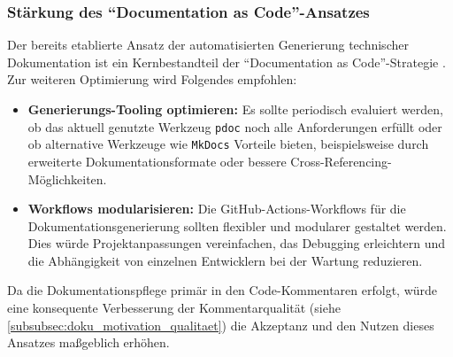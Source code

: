 \documentclass[12pt,oneside]{article}
\begin{document}
    \subsubsection{Stärkung des ``Documentation as Code''-Ansatzes}
    \label{subsubsec:doku_docs_as_code}
    Der bereits etablierte Ansatz der automatisierten Generierung technischer Dokumentation ist ein Kernbestandteil der ``Documentation as Code''-Strategie \cite{WriteTheDocsWhatIsDocsAsCode}. Zur weiteren Optimierung wird Folgendes empfohlen:
    \begin{itemize}
        \item \textbf{Generierungs-Tooling optimieren:} Es sollte periodisch evaluiert werden, ob das aktuell genutzte Werkzeug \texttt{pdoc} noch alle Anforderungen erfüllt oder ob alternative Werkzeuge wie \texttt{MkDocs} Vorteile bieten, beispielsweise durch erweiterte Dokumentationsformate oder bessere Cross-Referencing-Möglichkeiten.
        \item \textbf{Workflows modularisieren:} Die GitHub-Actions-Workflows für die Dokumentationsgenerierung sollten flexibler und modularer gestaltet werden. Dies würde Projektanpassungen vereinfachen, das Debugging erleichtern und die Abhängigkeit von einzelnen Entwicklern bei der Wartung reduzieren.
    \end{itemize}
    Da die Dokumentationspflege primär in den Code-Kommentaren erfolgt, würde eine konsequente Verbesserung der Kommentarqualität (siehe \ref{subsubsec:doku_motivation_qualitaet}) die Akzeptanz und den Nutzen dieses Ansatzes maßgeblich erhöhen.
\end{document}
